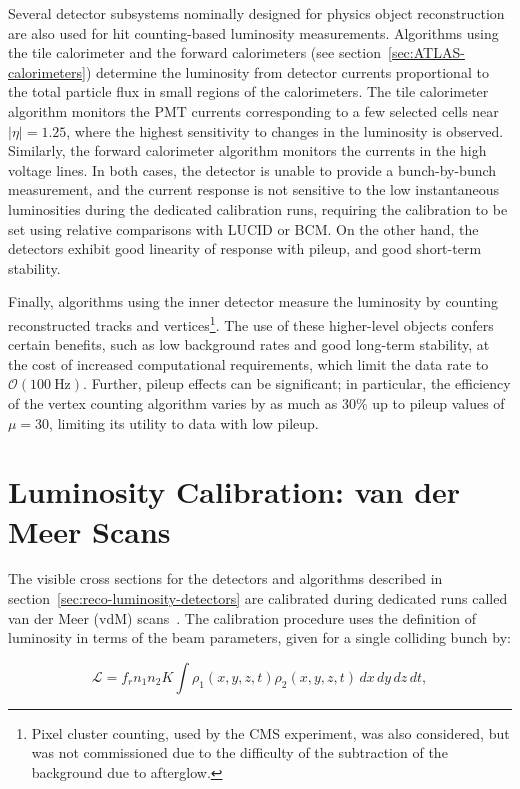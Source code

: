 Several detector subsystems nominally designed for physics object reconstruction are also used for hit counting-based luminosity measurements. Algorithms using the tile calorimeter and the forward calorimeters (see section~\ref{sec:ATLAS-calorimeters}) determine the luminosity from detector currents proportional to the total particle flux in small regions of the calorimeters. The tile calorimeter algorithm monitors the PMT currents corresponding to a few selected cells near $|\eta|=1.25$, where the highest sensitivity to changes in the luminosity is observed. Similarly, the forward calorimeter algorithm monitors the currents in the high voltage lines. In both cases, the detector is unable to provide a bunch-by-bunch measurement, and the current response is not sensitive to the low instantaneous luminosities during the dedicated calibration runs, requiring the calibration to be set using relative comparisons with LUCID or BCM. On the other hand, the detectors exhibit good linearity of response with pileup, and good short-term stability. 

Finally, algorithms using the inner detector measure the luminosity by counting reconstructed tracks and vertices\footnote{Pixel cluster counting, used by the CMS experiment, was also considered, but was not commissioned due to the difficulty of the subtraction of the background due to afterglow.}. The use of these higher-level objects confers certain benefits, such as low background rates and good long-term stability, at the cost of increased computational requirements, which limit the data rate to $\mathcal{O}(\SI{100}{\hertz})$. Further, pileup effects can be significant; in particular, the efficiency of the vertex counting algorithm varies by as much as $30\%$ up to pileup values of $\mu=30$, limiting its utility to data with low pileup. 

\section{Luminosity Calibration: van der Meer Scans}\label{sec:reco-luminosity-calibration}
The visible cross sections for the detectors and algorithms described in section~\ref{sec:reco-luminosity-detectors} are calibrated during dedicated runs called van der Meer (vdM) scans~\cite{vanderMeer:1968ud}. The calibration procedure uses the definition of luminosity in terms of the beam parameters, given for a single colliding bunch by:

\begin{equation}\label{eqn:luminosity-geometrical}
	\mathcal{L} = f_r n_1 n_2 K \int \rho_1(x,y,z,t) \rho_2(x,y,z,t)\, dx\,dy\,dz\,dt,
\end{equation}

